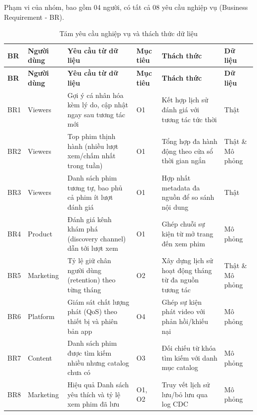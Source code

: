 \documentclass[a4paper,11pt]{article}
\newlength{\reporttablewidth}
\begin{document}
Phạm vi của nhóm, bao gồm 04 người, có tất cả 08 yêu cầu nghiệp vụ (Business Requirement - BR).

\begingroup
\footnotesize
{}
\setlength{\tabcolsep}{4pt}
\renewcommand{\arraystretch}{1.18}
\setlength{\reporttablewidth}{\dimexpr\linewidth-10\tabcolsep\relax}
\begin{longtable}{@{}L{0.07\reporttablewidth} L{0.14\reporttablewidth} L{0.29\reporttablewidth} L{0.09\reporttablewidth} L{0.27\reporttablewidth} L{0.14\reporttablewidth}@{}}
\caption[Tám yêu cầu nghiệp vụ và thách thức dữ liệu (mục 2.2)]{Tám yêu cầu nghiệp vụ và thách thức dữ liệu}\label{tab:03} \\
\toprule
\textbf{BR} & \textbf{Người dùng} & \textbf{Yêu cầu từ dữ liệu} & \textbf{Mục tiêu} & \textbf{Thách thức} & \textbf{Dữ liệu} \\
\midrule
\endfirsthead
\toprule
\textbf{BR} & \textbf{Người dùng} & \textbf{Yêu cầu từ dữ liệu} & \textbf{Mục tiêu} & \textbf{Thách thức} & \textbf{Dữ liệu} \\
\midrule
\endhead
\midrule
\endfoot
\bottomrule
\endlastfoot
BR1 & Viewers & Gợi ý cá nhân hóa kèm lý do, cập nhật ngay sau tương tác mới & O1 & Kết hợp lịch sử đánh giá với tương tác tức thời & Thật \\
BR2 & Viewers & Top phim thịnh hành (nhiều lượt xem/chấm nhất trong tuần) & O1 & Tổng hợp đa hành động theo cửa sổ thời gian ngắn & Thật \& Mô phỏng \\
BR3 & Viewers & Danh sách phim tương tự, bao phủ cả phim ít lượt đánh giá & O1 & Hợp nhất metadata đa nguồn để so sánh nội dung & Thật \\
BR4 & Product & Đánh giá kênh khám phá (discovery channel) dẫn tới lượt xem & O1 & Ghép chuỗi sự kiện từ mở trang đến xem phim & Mô phỏng \\
BR5 & Marketing & Tỷ lệ giữ chân người dùng (retention) theo từng tháng & O2 & Xây dựng lịch sử hoạt động tháng từ đa nguồn tương tác & Thật \& Mô phỏng \\
BR6 & Platform & Giám sát chất lượng phát (QoS) theo thiết bị và phiên bản app & O4 & Ghép sự kiện phát video với phản hồi/khiếu nại & Mô phỏng \\
BR7 & Content & Danh sách phim được tìm kiếm nhiều nhưng catalog chưa có & O3 & Đối chiếu từ khóa tìm kiếm với danh mục catalog & Mô phỏng \\
BR8 & Marketing & Hiệu quả Danh sách yêu thích và tỷ lệ xem phim đã lưu & O1, O2 & Truy vết lịch sử lưu/bỏ lưu qua log CDC & Mô phỏng \\
\end{longtable}
\endgroup
\end{document}
